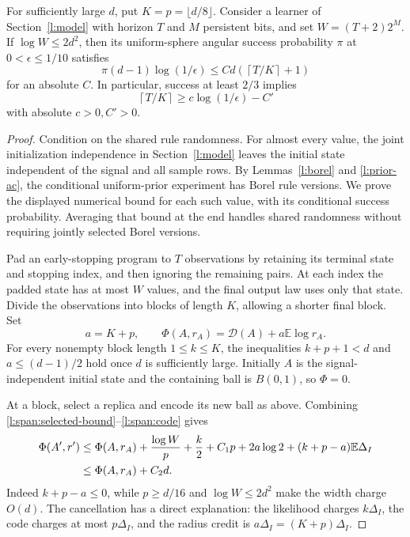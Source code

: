 \begin{proposition}
\label{l:span:block-bound}
For sufficiently large \(d\), put \(K=p=\lfloor d/8\rfloor\).
Consider a learner of Section~\ref{l:model} with horizon \(T\) and
\(M\) persistent bits, and set \(W=(T+2)2^M\).  If
\(\log W\le2d^2\), then its uniform-sphere angular success
probability \(\pi\) at \(0<\epsilon\le1/10\) satisfies
\begin{equation}
 \pi(d-1)\log(1/\epsilon)
 \le C d\left(\left\lceil T/K\right\rceil+1\right)
 \label{l:span:success-bound}
\end{equation}
for an absolute \(C\).  In particular, success at least \(2/3\)
implies
\[
 \left\lceil T/K\right\rceil
       \ge c\log(1/\epsilon)-C'
\]
with absolute \(c>0,C'>0\).
\end{proposition}
\begin{proof}
Condition on the shared rule randomness.  For almost every value, the
joint initialization independence in Section~\ref{l:model} leaves
the initial state independent of the signal and all sample rows.
By Lemmas~\ref{l:borel} and \ref{l:prior-ac}, the conditional
uniform-prior experiment has Borel rule versions.  We prove the
displayed numerical bound for each such value, with its conditional
success probability.  Averaging that bound at the end handles shared
randomness without requiring jointly selected Borel versions.

Pad an early-stopping program to \(T\) observations by retaining its
terminal state and stopping index, and then ignoring the remaining
pairs.  At each index the padded state has at most \(W\) values, and
the final output law uses only that state.  Divide the observations
into blocks of length \(K\), allowing a shorter final block.  Set
\[
 a=K+p,\qquad
 \Phi(A,r_A)=\mathcal D(A)+a\mathbb E\log r_A.
\]
For every nonempty block length \(1\le k\le K\), the inequalities
\(k+p+1<d\) and \(a\le(d-1)/2\) hold once \(d\) is sufficiently
large.  Initially \(A\) is the signal-independent initial state and
the containing ball is \(B(0,1)\), so \(\Phi=0\).

At a block, select a replica and encode its new ball as above.
Combining \eqref{l:span:selected-bound}--\eqref{l:span:code} gives
\begin{align}
 \Phi(A',r')
 &\le\Phi(A,r_A)+\frac{\log W}{p}+\frac{k}{2}+C_1p+2a\log2
           +(k+p-a)\mathbb E\Delta_I \notag\\
 &\le\Phi(A,r_A)+C_2d.
 \label{l:span:drift}
\end{align}
Indeed \(k+p-a\le0\), while \(p\ge d/16\) and
\(\log W\le2d^2\) make the width charge \(O(d)\).
The cancellation has a direct explanation: the likelihood
charges \(k\Delta_I\), the code charges at most \(p\Delta_I\), and
the radius credit is \(a\Delta_I=(K+p)\Delta_I\).


\end{proof}
